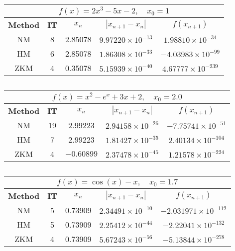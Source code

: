 \begin{table}[H]
		\caption{}
		\renewcommand{\arraystretch}{1.5}
		\centering
		\begin{english}
	\begin{tabular}{|c|c|c|c|c|}
		\hline
		\multicolumn{5}{|c|}{$f(x) = 2x^3 - 5x - 2, \quad x_0 = 1$}\\
		\hline
		\textbf{Method} & \textbf{IT} & $x_n$ & $|x_{n+1}-x_n|$& $f(x_{n+1})$ \\
		\hline
		NM & 8 & 2.85078 & $9.97220\times 10^{-13}$ & $1.98810\times 10^{-34}$\\
		HM & 6 & 2.85078 & $1.86308\times 10^{-33}$ & $-4.03983\times 10^{-99}$\\
		ZKM & 4 & 0.35078 & $5.15939\times10^{-40}$ & $4.67777 \times10^{-239}$\\
		\hline
	\end{tabular}
\end{english}
\end{table}
\vspace{1cm}
\begin{table}[H]
	\caption{}
	\renewcommand{\arraystretch}{1.5}
	\centering
	\begin{english}
		\begin{tabular}{|c|c|c|c|c|}
			\hline
			\multicolumn{5}{|c|}{$f(x) = x^2 - e^x + 3x +2, \quad x_0 = 2.0$}\\
			\hline
			\textbf{Method} & \textbf{IT} & $x_n$ & $|x_{n+1}-x_n|$& $f(x_{n+1})$ \\
			\hline
			NM & 19 & 2.99223 & $2.94158\times 10^{-26}$ & $-7.75741\times 10^{-51}$\\
			HM & 7 & 2.99223 & $1.81427\times 10^{-35}$ & $2.40134\times 10^{-104}$\\
			ZKM & 4 & $-0.60899$ & $2.37478\times10^{-45}$ & $1.21578\times10^{-224}$\\
			\hline
		\end{tabular}
	\end{english}
\end{table}
\newpage
\begin{table}[H]
	\caption{}
	\renewcommand{\arraystretch}{1.5}
	\centering
	\begin{english}
		\begin{tabular}{|c|c|c|c|c|}
			\hline
			\multicolumn{5}{|c|}{$f(x) = \cos(x) - x, \quad x_0 = 1.7$}\\
			\hline
			\textbf{Method} & \textbf{IT} & $x_n$ & $|x_{n+1}-x_n|$& $f(x_{n+1})$ \\
			\hline
			NM & 5 & 0.73909 & $2.34491\times 10^{-10}$ & $-2.031971\times 10^{-112}$\\
			HM & 5 & 0.73909 & $2.25412\times 10^{-44}$ & $-2.22041\times 10^{-132}$\\
			ZKM & 4 & 0.73909 & $5.67243\times10^{-56}$ & $-5.13844 \times10^{-278}$\\
			\hline
		\end{tabular}
	\end{english}
\end{table}
